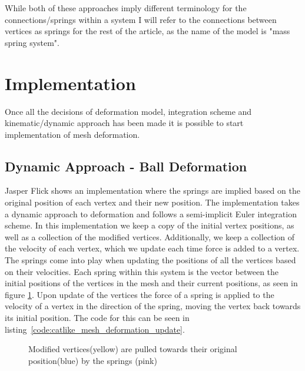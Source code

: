 While both of these approaches imply different terminology for the connections/springs within a system I will refer to the connections between vertices as springs for the rest of the article, as the name of the model is "mass spring system".

\section{Implementation}
Once all the decisions of deformation model, integration scheme and kinematic/dynamic approach has been made it is possible to start implementation of mesh deformation.

\subsection{Dynamic Approach - Ball Deformation}
Jasper Flick\cite{catlike_mesh_deformation} shows an implementation where the springs are implied based on the original position of each vertex and their new position.
The implementation takes a dynamic approach to deformation and follows a semi-implicit Euler integration scheme.
In this implementation we keep a copy of the initial vertex positions, as well as a collection of the modified vertices.
Additionally, we keep a collection of the velocity of each vertex, which we update each time force is added to a vertex.
The springs come into play when updating the positions of all the vertices based on their velocities.
Each spring within this system is the vector between the initial positions of the vertices in the mesh and their current positions, as seen in figure \ref{fig:catlike_mesh_deformation_springs}.
Upon update of the vertices the force of a spring is applied to the velocity of a vertex in the direction of the spring, moving the vertex back towards its initial position.
The code for this can be seen in listing~\ref{code:catlike_mesh_deformation_update}.


\begin{figure}
\centering
    \caption{Modified vertices(yellow) are pulled towards their original position(blue) by the springs (pink)\cite{catlike_mesh_deformation}}
    \label{fig:catlike_mesh_deformation_springs}
\end{figure}

